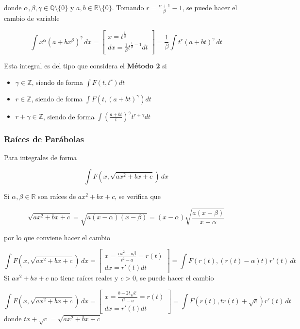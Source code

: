 donde $\alpha, \beta, \gamma \in \mathbb{Q}\setminus\{0\}$ y $a, b\in\mathbb{R}\setminus\{0\}$. Tomando $r = \frac{\alpha+1}{\beta}-1$, se puede hacer el cambio de variable

\[\int x^\alpha(a+bx^\beta)^\gamma\,dx =
\begin{bmatrix}
x = t^\frac{1}{\beta}\\
dx=\frac{1}{\beta}t^{\frac{1}{\beta}-1}dt
\end{bmatrix}
= \frac{1}{\beta}\int t^r(a+bt)^\gamma\,dt\]

Esta integral es del tipo que considera el \textbf{Método 2} si %

\begin{itemize}
    \item $\gamma\in\mathbb{Z}$, siendo de forma $\int F(t, t^r)dt$
    \item $r\in\mathbb{Z}$, siendo de forma $\int F(t, (a+bt)^\gamma)dt$
    \item $r+\gamma\in\mathbb{Z}$, siendo de forma $\int \left(\frac{a+bt}{t}\right)^\gamma t^{r+\gamma}dt$
\end{itemize}

\subsubsection{Raíces de Parábolas}

Para integrales de forma

\[\int F(x, \sqrt{ax^2+bx+c})\, dx\]

Si $\alpha, \beta\in\mathbb{R}$ son raíces de $ax^2+bx+c$, se verifica que

\[\sqrt{ax^2+bx+c}=\sqrt{a(x-\alpha)(x-\beta)} =
(x-\alpha)\sqrt{\frac{a(x-\beta)}{x-\alpha}}\]

por lo que conviene hacer el cambio

\begin{equation}
\int F(x,\sqrt{ax^2+bx+c})\,dx =
\begin{bmatrix}
x = \frac{\alpha t^2-a\beta}{t^2-a} = r(t)\\
dx = r'(t)dt
\end{bmatrix} =
\int F(r(t),(r(t)-\alpha)t)r'(t)\,dt
\nonumber
\end{equation}
\bigbreak
\bigbreak
Si $ax^2+bx+c$ no tiene raíces reales y $c>0$, se puede hacer el cambio

\begin{equation}
\int F(x,\sqrt{ax^2+bx+c})\,dx =
\begin{bmatrix}
x = \frac{b-2t\sqrt{c}}{t^2-a} = r(t)\\
dx = r'(t)dt
\end{bmatrix} =
\int F(r(t),tr(t)+\sqrt{c})r'(t)\,dt
\nonumber
\end{equation}
\bigbreak
donde $tx+\sqrt{c} = \sqrt{ax^2+bx+c}$

\newpage